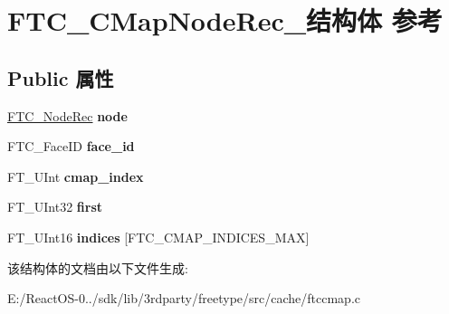 \hypertarget{struct_f_t_c___c_map_node_rec__}{}\section{F\+T\+C\+\_\+\+C\+Map\+Node\+Rec\+\_\+结构体 参考}
\label{struct_f_t_c___c_map_node_rec__}
\subsection*{Public 属性}
\begin{DoxyCompactItemize}
\item 
\mbox{\label{struct_f_t_c___c_map_node_rec___a027dbba40fff69333ec20b4bc311a4f0}} 
\hyperlink{struct_f_t_c___node_rec__}{F\+T\+C\+\_\+\+Node\+Rec} {\bfseries node}
\item 
\mbox{\label{struct_f_t_c___c_map_node_rec___af2ca35f6d1e802f1613be2145097ecb5}} 
F\+T\+C\+\_\+\+Face\+ID {\bfseries face\+\_\+id}
\item 
\mbox{\label{struct_f_t_c___c_map_node_rec___a8af466d65b197704ca39be5e7b0fa2ed}} 
F\+T\+\_\+\+U\+Int {\bfseries cmap\+\_\+index}
\item 
\mbox{\label{struct_f_t_c___c_map_node_rec___a386e8bde9f720faeb8c1437fb0b6b593}} 
F\+T\+\_\+\+U\+Int32 {\bfseries first}
\item 
\mbox{\label{struct_f_t_c___c_map_node_rec___ae3801fdfb4ec0e8c2ac9dd3e92207f44}} 
F\+T\+\_\+\+U\+Int16 {\bfseries indices} \mbox{[}F\+T\+C\+\_\+\+C\+M\+A\+P\+\_\+\+I\+N\+D\+I\+C\+E\+S\+\_\+\+M\+AX\mbox{]}
\end{DoxyCompactItemize}


该结构体的文档由以下文件生成\+:\begin{DoxyCompactItemize}
\item 
E\+:/\+React\+O\+S-\/0../sdk/lib/3rdparty/freetype/src/cache/ftccmap.\+c\end{DoxyCompactItemize}
